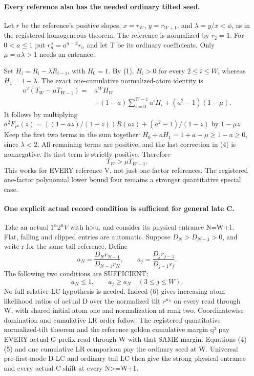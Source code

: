 \paragraph{Every reference also has the needed ordinary tilted seed.}
Let $r$ be the reference's positive slopes, $x=r_W$, $y=r_{W+1}$,
and $\lambda=y/x<\phi$, as in the registered homogeneous theorem.
The reference is normalized by $r_2=1$. For $0<a\le1$ put
$r^a_n=a^{n-2}r_n$ and let T be its ordinary coefficients.
Only $\mu=a\lambda>1$ needs an entrance.

Set $H_i=R_i-\lambda R_{i-1}$, with $H_0=1$.
By (1), $H_i>0$ for every $2\le i\le W$,
whereas $H_1=1-\lambda$.
The exact one-cumulative normalized-atom identity is
\[
\begin{split}
 a^2(T_W-\mu T_{W-1})={}&a^WH_W\\
 &+(1-a)\sum_{i=0}^{W-1}a^iH_i+(a^2-1)(1-\mu).
\end{split}                                                   \tag{4}
\]
It follows by multiplying
$a^2F_{r^a}(z)=((1-az)/(1-z))R(az)+(a^2-1)/(1-z)$
by $1-\mu z$. Keep the first two terms in the sum together:
$H_0+aH_1=1+a-\mu\ge1-a\ge0$, since $\lambda<2$.
All remaining terms are positive, and the last correction in (4)
is nonnegative. Its first term is strictly positive. Therefore
\[
                         T_W>\mu T_{W-1}.            \tag{5}
\]
This works for EVERY reference V, not just one-factor references.
The registered one-factor polynomial lower bound four remains a
stronger quantitative special case.

\paragraph{One explicit actual record condition is sufficient for general late C.}
Take an actual $1^\alpha2^uV$ with h>u, and consider its physical
entrance N=W+1. Flat, falling and clipped entries are automatic.
Suppose $D_N>D_{N-1}>0$, and write r for the same-tail reference.
Define
\[
 a_N=\frac{D_Nr_{N-1}}{D_{N-1}r_N},\qquad
 a_j=\frac{D_jr_{j-1}}{D_{j-1}r_j}.
\]
The following two conditions are SUFFICIENT:
\[
                         a_N\le1,\qquad
                    a_j\ge a_N\quad(3\le j\le W).     \tag{6}
\]
No full relative-LC hypothesis is needed.
Indeed (6) gives increasing atom likelihood ratios of actual D over
the normalized tilt $r^{a_N}$ on every read through W, with shared
initial atom one and normalization at rank two.
Coordinatewise domination and cumulative LR order follow.
The registered quantitative normalized-tilt theorem and the reference
golden cumulative margin q² pay EVERY actual G prefix read through W
with that SAME margin. Equations (4)--(5) and one cumulative LR
comparison pay the ordinary seed at W.
Universal pre-first-mode D-LC and ordinary tail LC then give the
strong physical entrance and every actual C shift at every N>=W+1.

